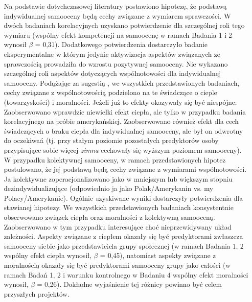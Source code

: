 \documentclass[man]{apa6}
\begin{document}
Na podstawie dotychczasowej literatury postawiono hipotezę, że podstawą indywidualnej samooceny będą cechy związane z wymiarem sprawczości. W dwóch badaniach korelacyjnych uzyskano potwierdzenie dla szczególnej roli tego wymiaru (wspólny efekt kompetencji na samoocenę w ramach Badania 1 i 2 wynosił $\beta$ = 0,31). Dodatkowego potwierdzenia dostarczyło badanie eksperymentalne w którym jedynie aktywizacja aspektów związanych ze sprawczością prowadziła do wzrostu pozytywnej samooceny. Nie wykazano szczególnej roli aspektów dotyczących wspólnotowości dla indywidualnej samooceny. Podążając za sugestią \textcite{brambilla2014importance}, we wszystkich przedstawionych badaniach, cechy związane z wspólnotowością podzielono na te świadczące o cieple (towarzyskości) i moralności. Jeżeli już to efekty okazywały się być niespójne. Zaobserwowano wprawdzie niewielki efekt ciepła, ale tylko w przypadku badania korelacyjnego na próbie amerykańskiej. Zaobserwowano również efekt dla cech świadczących o braku ciepła dla indywidualnej samooceny, ale był on odwrotny do oczekiwań (tj. przy stałym poziomie pozostałych predyktorów osoby przypisujące sobie więcej \emph{zimna} cechowały się wyższym poziomem samooceny).\\

W przypadku kolektywnej samooceny, w ramach przedstawionych hipotez postulowano, że jej podstawą będą cechy związane z wymiarami wspólnotowości. Ja kolektywne zoperacjonalizowano jako w mniejszym lub większym stopniu dezindywidualizujące (odpowiednio ja jako Polak/Amerykanin vs. my Polacy/Amerykanie). Ogólnie uzyskiwane wyniki dostarczyły potwierdzenia dla stawianej hipotezy. We wszystkich przedstawionych badaniach konsystentnie obserwowano związek ciepła oraz moralności z kolektywną samooceną. Zaobserwowano w tym przypadku interesujące choć nieprzewidywany układ zależności. Aspekty związane z ciepłem okazały się być predyktorami zwłaszcza samooceny siebie jako przedstawiciela grupy społecznej (w ramach Badania 1, 2 wspólny efekt ciepła wynosił, $\beta$ = 0,45), natomiast aspekty związane z moralnością okazały się być predyktorami samooceny grupy jako całości (w ramach Badań 1, 2 i warunku kontrolnego w Badaniu 4 wspólny efekt moralności wynosił, $\beta$ = 0,26). Dokładne wyjaśnienie tej różnicy powinno być celem przyszłych projektów. \\
\end{document}
